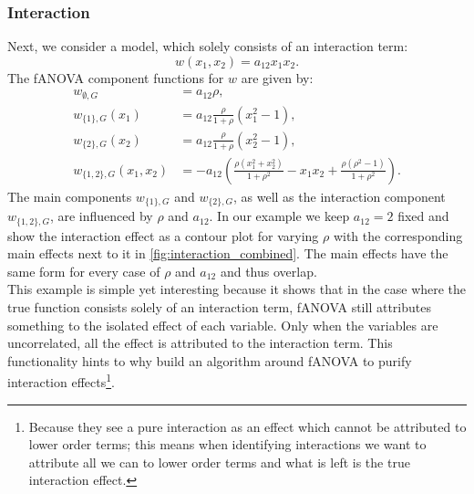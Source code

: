 \subsubsection{Interaction}
Next, we consider a model, which solely consists of an interaction term:
$$w(x_1, x_2) = a_{12} x_1 x_2.$$
The fANOVA component functions for $w$ are given by:
\begin{align*}
    w_{\emptyset, G} &= a_{12} \rho, \\[0.5em]
    w_{\{1\}, G}(x_1) &= a_{12} \frac{\rho}{1+ \rho} (x_1^2 - 1), \\[0.5em]
    w_{\{2\}, G}(x_2) &= a_{12} \frac{\rho}{1+ \rho} (x_2^2 - 1), \\[0.5em]
    w_{\{1,2\}, G}(x_1,x_2) 
&= -a_{12}\!\left(
    \frac{\rho(x_1^2+x_2^2)}{1+\rho^2} 
    - x_1 x_2 
    + \frac{\rho(\rho^2-1)}{1+\rho^2}
   \right).
\end{align*}
The main components $w_{\{1\}, G}$ and $w_{\{2\}, G}$, as well as the interaction component $w_{\{1,2\}, G}$, are influenced by $\rho$ and $a_{12}$.
In our example we keep $a_{12} = 2$ fixed and show the interaction effect as a contour plot for varying $\rho$ with the corresponding main effects next to it in \autoref{fig:interaction_combined}.
The main effects have the same form for every case of $\rho$ and $a_{12}$ and thus overlap.\\
This example is simple yet interesting because it shows that in the case where the true function consists solely of an interaction term, fANOVA still attributes something to the isolated effect of each variable. Only when the variables are uncorrelated, all the effect is attributed to the interaction term. This functionality hints to why \cite{lengerich2020} build an algorithm around fANOVA to purify interaction effects\footnote{Because they see a pure interaction as an effect which cannot be attributed to lower order terms; this means when identifying interactions we want to attribute all we can to lower order terms and what is left is the true interaction effect.}.


